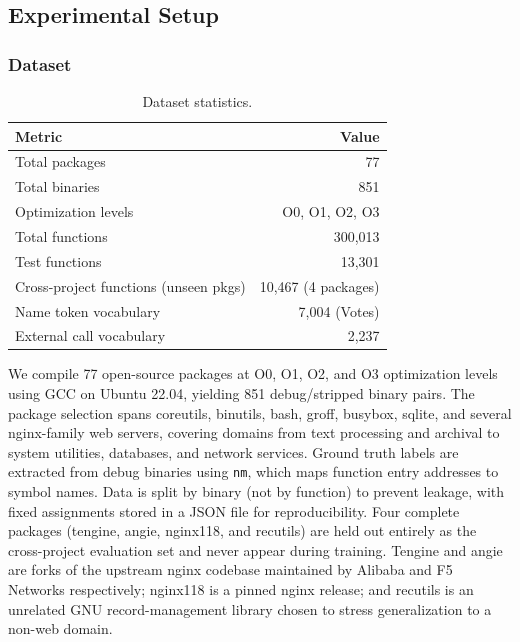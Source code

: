 \documentclass[sigconf,nonacm]{acmart}
\begin{document}
\subsection{Experimental Setup}

\subsubsection{Dataset}

\begin{table}[t]
    \centering
    \caption{Dataset statistics.}
    \label{tab:dataset}
    \footnotesize
    \begin{tabular}{lr}
        \toprule
        \textbf{Metric} & \textbf{Value} \\
        \midrule
        Total packages & 77 \\
        Total binaries & 851 \\
        Optimization levels & O0, O1, O2, O3 \\
        Total functions & 300{,}013 \\
        Test functions & 13{,}301 \\
        Cross-project functions (unseen pkgs) & 10{,}467 (4 packages) \\
        Name token vocabulary & 7{,}004 (Votes) \\
        External call vocabulary & 2{,}237 \\
        \bottomrule
    \end{tabular}
\end{table}

We compile 77 open-source packages at O0, O1, O2, and O3 optimization levels using GCC on Ubuntu 22.04, yielding 851 debug/stripped binary pairs. The package selection spans coreutils, binutils, bash, groff, busybox, sqlite, and several nginx-family web servers, covering domains from text processing and archival to system utilities, databases, and network services. Ground truth labels are extracted from debug binaries using \texttt{nm}, which maps function entry addresses to symbol names. Data is split by binary (not by function) to prevent leakage, with fixed assignments stored in a JSON file for reproducibility. Four complete packages (tengine, angie, nginx118, and recutils) are held out entirely as the cross-project evaluation set and never appear during training. Tengine and angie are forks of the upstream nginx codebase maintained by Alibaba and F5 Networks respectively; nginx118 is a pinned nginx release; and recutils is an unrelated GNU record-management library chosen to stress generalization to a non-web domain.
\end{document}
